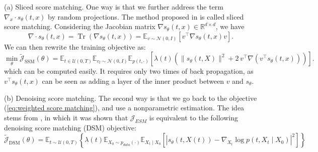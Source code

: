 \documentclass[letterpaper,10pt,reqno]{amsart}
\def\eqref#1{(\ref{#1})}
\numberwithin{equation}{section}
\begin{document}

\smallskip
(a) Sliced score matching. 
One way is that we further address the term $\nabla_x\cdot s_{\theta}(t,x)$ by random projections. The method proposed in \cite{Song20sl} is called sliced score matching. 
Considering the Jacobian matrix $\nabla s_{\theta}(t,x)\in\mathbb{R}^{d \times d}$, 
we have
$$
\nabla \cdot s_{\theta}(t,x)=\operatorname{Tr}(\nabla s_{\theta}(t,x))=\mathbb{E}_{v\sim \mathcal{N}(0,I)}\left[v^{\top}\nabla s_{\theta}(t,x)v\right].
$$
We can then rewrite the training objective as:
\begin{equation}
\label{eq:equivscorematb_slicedSM}
\min_\theta \widetilde{\mathcal{J}}_{\text{SSM}}(\theta) = \mathbb{E}_{t \in \mathcal{U}(0, T)}\mathbb{E}_{v_t\sim \mathcal{N}(0,I)}\mathbb{E}_{p(t, \cdot)} \left[\lambda(t)\left(\|s_\theta(t,X)\|^2  + 2 \, v^{\top}\nabla (v^{\top}s_{\theta}(t,x))\right)\right].
\end{equation}
which can be computed easily. 
It requires only two times of back propagation, as $v^{\top}s_{\theta}(t,x)$ can be seen as adding a layer of the inner product between $v$ and $s_{\theta}$.

\medskip
(b) Denoising score matching. 
The second way is that we go back to the objective \eqref{eq:weighted score matching},
and use a nonparametric estimation.
The idea stems from \cite{Hyv05,Vi11},
in which it was shown that 
$\mathcal{J}_{ESM}$ is equivalent to the following denoising score matching (DSM) objective:
$$
\tilde{\mathcal{J}}_{\text{DSM}}(\theta)=\mathbb{E}_{t\sim\mathcal{U}(0, T)}\left\{\lambda(t) \mathbb{E}_{X_0\sim p_{data}(\cdot)} \mathbb{E}_{X_t \mid X_0}\left[\left|s_{\theta}(t,X(t))-\nabla_{X_t} \log p(t,X_t \mid X_0)\right|^2\right]\right\}
$$
\end{document}
